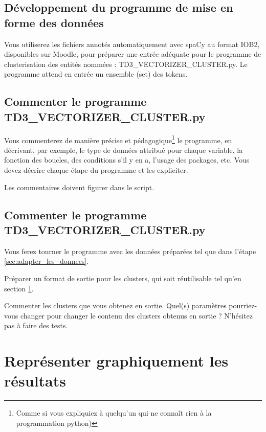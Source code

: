 \vspace{0.5cm}
\subsection{Développement du programme de mise en forme des données}
\vspace{0.5cm}
\label{sec:adapter_les_donnees}
Vous utiliserez les fichiers annotés automatiquement avec spaCy au format IOB2, disponibles sur Moodle, pour préparer une entrée adéquate pour le programme de clusterisation des entités nommées : TD3\_VECTORIZER\_CLUSTER.py. Le programme attend en entrée un ensemble (set) des tokens.


\subsection{Commenter le programme TD3\_VECTORIZER\_CLUSTER.py}

Vous commenterez de manière précise et pédagogique\footnote{Comme si vous expliquiez à quelqu'un qui ne connaît rien à la programmation python)} le programme, en décrivant, par exemple, le type de données attribué pour chaque variable, la fonction des boucles, des conditions s'il y en a, l'usage des packages, etc.
\newline
Vous devez décrire chaque étape du programme et les expliciter.
\newline

Les commentaires doivent figurer dans le script.

\subsection{Commenter le programme TD3\_VECTORIZER\_CLUSTER.py}

Vous ferez tourner le programme avec les données préparées tel que dans l'étape \ref{sec:adapter_les_donnees}.

Préparer un format de sortie pour les clusters, qui soit réutilisable tel qu'en section \ref{sec:representation_graphique}.

Commenter les clusters que vous obtenez en sortie. Quel(s) paramètres pourriez-vous changer pour changer le contenu des clusters obtenus en sortie ? N'hésitez pas à faire des tests.
 
\section{Représenter graphiquement les résultats}
 \label{sec:representation_graphique}
 
